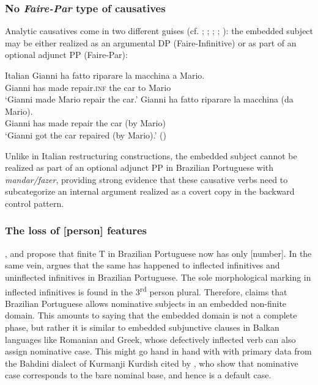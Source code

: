\documentclass[output=paper]{langsci/langscibook}
\begin{document}
\subsubsection{No \textit{Faire-Par} type of causatives} %

Analytic causatives come in two different guises (cf. \citealt{Kayne1975}; \citealt{Huber1980}; \citealt{Burzio1986}; \citealt{Enzinger2010}; \citealt{Campanini2012}): the embedded subject may be either realized as an argumental DP  (Faire-Infinitive) or as part of an optional adjunct PP (Faire-Par):

\ea%
         Italian\label{ex:moreno:18}
    \ea  
    \gll Gianni ha  fatto   riparare    la   macchina a Mario.\\
         Gianni has made repair.\textsc{inf} the car    to Mario \\
    \glt ‘Gianni made Mario repair the car.’
    \ex  
    \gll Gianni ha fatto    riparare   la  macchina   (da Mario). \\
         Gianni has made repair   the car  (by Mario) \\
    \glt ‘Gianni got the car repaired (by Mario).’ (\citealt{Campanini2012})
    \z
\z

Unlike in Italian restructuring constructions, the embedded subject cannot be realized as part of an optional adjunct PP in Brazilian Portuguese with \textit{mandar\slash fazer}, providing strong evidence that these causative verbs need to subcategorize an internal argument realized as a covert copy in the backward control pattern. 

    \z



\subsubsection{The loss of [person] features}%

\citet{Nunes2008}, \citet{Ferreira2009} and \citet{Rodrigues2004} propose that finite T in Brazilian Portuguese now has only [number]. In the same vein, \citet{Cyrino2010} argues that the same has happened to inflected infinitives and uninflected infinitives in Brazilian Portuguese. The sole morphological marking in inflected infinitives is found in the 3\textsuperscript{rd} person plural. Therefore, \citet{Cyrino2010} claims that Brazilian Portuguese allows nominative subjects in an embedded non-finite domain. This amounts to saying that the embedded domain is not a complete phase, but rather it is similar to embedded subjunctive clauses in Balkan languages like Romanian and Greek, whose defectively inflected verb can also assign nominative case. This might go hand in hand with with primary data from the Bahdini dialect of Kurmanji Kurdish cited by \citet{Manzini2017}, who show that nominative case corresponds to the bare nominal base, and hence is a default case.  
\end{document}
